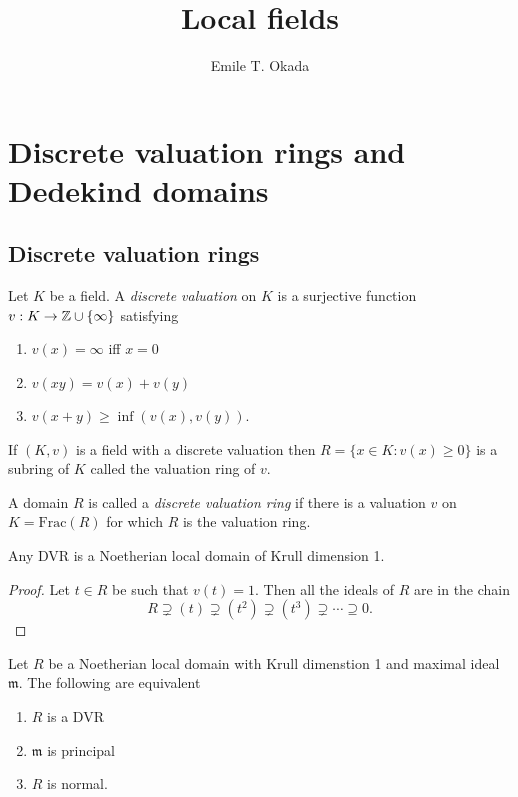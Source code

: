 \documentclass{memoir}
\title{Local fields}
\author{Emile T. Okada}
\begin{document}
\maketitle
\tableofcontents
\chapter{Discrete valuation rings and Dedekind domains}
\section{Discrete valuation rings}
\begin{definition}
    Let $K$ be a field.
    A \textit{discrete valuation} on $K$ is a surjective function $v:K\to \mathbb{Z}\cup\{\infty\}$ satisfying
    \begin{enumerate}
        \item $v(x) = \infty$ iff $x=0$
        \item $v(xy) = v(x) + v(y)$ 
        \item $v(x+y) \ge \inf(v(x),v(y))$.
    \end{enumerate}
    If $(K,v)$ is a field with a discrete valuation then $R = \{x\in K: v(x) \ge 0\}$ is a subring of $K$ called the valuation ring of $v$.
\end{definition}
\begin{definition}
    A domain $R$ is called a \textit{discrete valuation ring} if there is a valuation $v$ on $K=\text{Frac}(R)$ for which $R$ is the valuation ring.
\end{definition}
\begin{lemma}
    Any DVR is a Noetherian local domain of Krull dimension 1.
\end{lemma}
\begin{proof}
    Let $t\in R$ be such that $v(t) = 1$.
    Then all the ideals of $R$ are in the chain 
    \begin{equation}
        R \supsetneq (t) \supsetneq (t^2) \supsetneq (t^3) \supsetneq \cdots \supseteq 0.
    \end{equation}
\end{proof}
\begin{thm}
    Let $R$ be a Noetherian local domain with Krull dimenstion 1 and maximal ideal $\mathfrak m$.
    The following are equivalent
    \begin{enumerate}
        \item $R$ is a DVR
        \item $\mathfrak m$ is principal
        \item $R$ is normal.
    \end{enumerate}
\end{thm}
\end{document}
